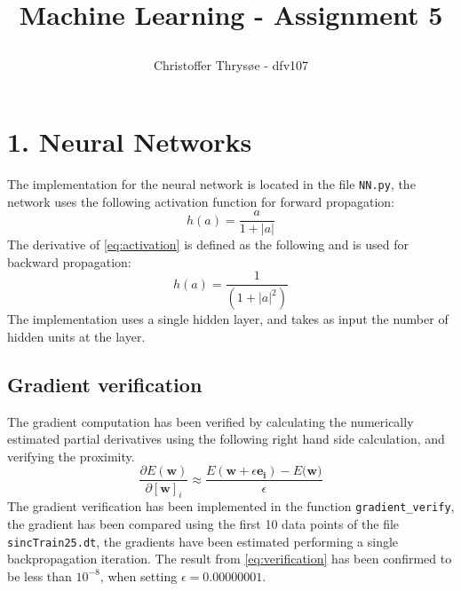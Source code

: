 \documentclass{article}
\title{
\vspace{1in}
\textmd{\textbf{Machine Learning - Assignment 5}} \\
\author{Christoffer Thrysøe - dfv107}
}
\begin{document}
\maketitle
{}
\section{1. Neural Networks}
The implementation for the neural network is located in the file \texttt{NN.py}, the network uses the following activation function for forward propagation:
\begin{equation}
h(a) = \dfrac{a}{1+|a|}
\label{eq:activation}
\end{equation}
The derivative of \eqref{eq:activation} is defined as the following and is used for backward propagation:
\begin{equation*}
h(a) = \dfrac{1}{(1+|a|^2)}
\end{equation*}
The implementation uses a single hidden layer, and takes as input the number of hidden units at the layer.
\subsection{Gradient verification}
The gradient computation has been verified by calculating the numerically estimated partial derivatives using the following right hand side calculation, and verifying the proximity. 
\begin{equation}
\dfrac{\partial E (\mathbf{w})}{\partial [\mathbf{w}]_i} \approx
\dfrac{E ( \mathbf{w} + \epsilon \mathbf{e_i}) - E ( \mathbf{w)}}{\epsilon}
\label{eq:verification}
\end{equation}
The gradient verification has been implemented in the function \texttt{gradient\_verify}, the gradient has been compared using the first 10 data points of the file \texttt{sincTrain25.dt}, the gradients have been estimated performing a single backpropagation iteration. The result from \eqref{eq:verification} has been confirmed to be less than $ 10^{-8}$, when setting $\epsilon = 0.00000001$.
\end{document}
